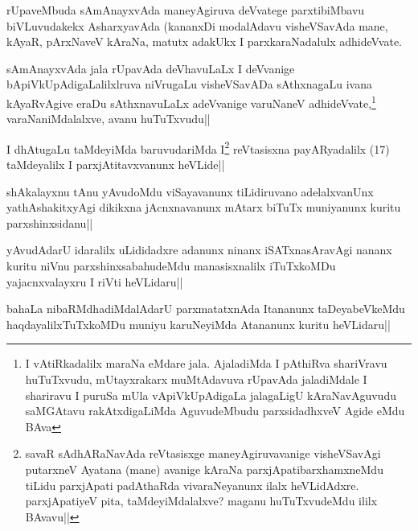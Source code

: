 
\begin{artha}
rUpaveMbuda sAmAnayxvAda maneyAgiruva deVvatege parxtibiMbavu biVLuvudakekx AsharxyavAda (kananxDi modalAdavu visheVSavAda mane, kAyaR, pArxNaveV kAraNa, matutx adakUkx I parxkaraNadalulx adhideVvate.
\end{artha}


\begin{artha}
sAmAnayxvAda jala rUpavAda deVhavuLaLx I deVvanige bApiVkUpAdigaLalilxlruva  niVrugaLu visheVSavADa sAthxnagaLu ivana kAyaRvAgive eraDu sAthxnavuLaLx adeVvanige varuNaneV adhideVvate,\footnote[2]{I vAtiRkadalilx maraNa eMdare jala. AjaladiMda I pAthiRva shariVravu huTuTxvudu, mUtayxrakarx muMtAdavuva rUpavAda jaladiMdale I shariravu I puruSa mUla vApiVkUpAdigaLa jalagaLigU kAraNavAguvudu saMGAtavu rakAtxdigaLiMda AguvudeMbudu parxsidadhxveV Agide eMdu BAva} varaNaniMdalalxve, avanu huTuTxvudu||
\end{artha}

\begin{artha}%
\stext I dhAtugaLu taMdeyiMda baruvudariMda I\footnote[1]{savaR sAdhARaNavAda reVtasisxge maneyAgiruvavanige visheVSavAgi putarxneV Ayatana (mane) avanige kAraNa parxjApatibarxhamxneMdu tiLidu parxjApati padAthaRda vivaraNeyanunx ilalx heVLidAdxre. parxjApatiyeV pita, taMdeyiMdalalxve? maganu huTuTxvudeMdu ililx BAvavu||} reVtasisxna payARyadalilx (17) taMdeyalilx I parxjAtitavxvanunx heVLide||
\end{artha}

\begin{artha}
shAkalayxnu tAnu yAvudoMdu viSayavanunx tiLidiruvano adelalxvanUnx yathAshakitxyAgi dikikxna jAcnxnavanunx mAtarx biTuTx muniyanunx kuritu parxshinxsidanu||
\end{artha}

\begin{artha}
yAvudAdarU idaralilx uLididadxre adanunx ninanx iSATxnasAravAgi nananx kuritu niVnu parxshinxsabahudeMdu manasisxnalilx iTuTxkoMDu yajacnxvalayxru I riVti heVLidaru||
\end{artha}

\begin{artha}
bahaLa nibaRMdhadiMdalAdarU parxmatatxnAda Itananunx taDeyabeVkeMdu haqdayalilxTuTxkoMDu muniyu karuNeyiMda Atananunx kuritu heVLidaru||
\end{artha}%

